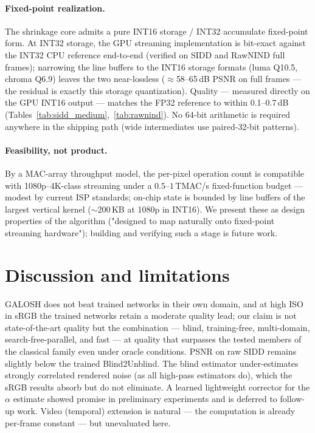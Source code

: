 \documentclass[10pt,twocolumn]{article}
\begin{document}
\paragraph{Fixed-point realization.} The shrinkage core admits a pure INT16
storage / INT32 accumulate fixed-point form. At INT32 storage, the GPU
streaming implementation is bit-exact against the INT32 CPU reference
end-to-end (verified on SIDD and RawNIND full frames); narrowing the line
buffers to the INT16 storage formats (luma Q10.5, chroma Q6.9) leaves the two
near-lossless ($\approx$58--65\,dB PSNR on full frames --- the residual is
exactly this storage quantization). Quality --- measured directly on the GPU
INT16 output --- matches the FP32 reference to within 0.1--0.7\,dB
(Tables~\ref{tab:sidd_medium},~\ref{tab:rawnind}). No 64-bit arithmetic is
required anywhere in the shipping path (wide intermediates use paired-32-bit
patterns).

\paragraph{Feasibility, not product.} By a MAC-array throughput model, the
per-pixel operation count is compatible with 1080p--4K-class streaming under
a $0.5$--$1$\,TMAC/s fixed-function budget --- modest by current ISP
standards; on-chip state is bounded by
line buffers of the largest vertical kernel ($\sim$200\,KB at 1080p in INT16).
We present these as design properties of the algorithm ("designed to map
naturally onto fixed-point streaming hardware"); building and verifying such a
stage is future work.

\section{Discussion and limitations}
GALOSH does not beat trained networks in their own domain, and at high ISO in
sRGB the trained networks retain a moderate quality lead; our claim is not
state-of-the-art quality but the combination --- blind, training-free,
multi-domain, search-free-parallel, and fast --- at quality that surpasses the
tested members of the
classical family even under oracle conditions. PSNR on raw SIDD remains
slightly below the trained Blind2Unblind. The blind estimator under-estimates
strongly correlated rendered noise (as all high-pass estimators do), which the
sRGB results absorb but do not eliminate. A learned lightweight corrector for
the $\alpha$ estimate showed promise in preliminary experiments and is
deferred to follow-up work. Video (temporal) extension is natural --- the
computation is already per-frame constant --- but unevaluated here.
\end{document}
